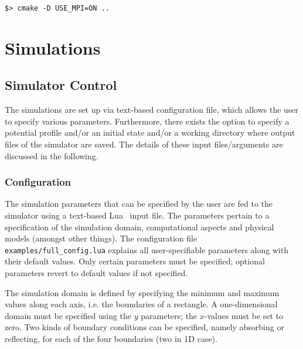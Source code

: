 \begin{lstlisting}
$> cmake -D USE_MPI=ON ..
\end{lstlisting}




\section{Simulations} \label{ch:simulations} %

\subsection{Simulator Control}

The simulations are set up via text-based configuration file, which allows the user to specify various parameters. Furthermore, there exists the option to specify a potential profile and/or an initial state and/or a working directory where output files of the simulator are saved. The details of these input files/arguments are discussed in the following.

\subsubsection{Configuration}

The simulation parameters that can be specified by the user are fed to the simulator using a text-based Lua~\cite{lua} input file. The parameters pertain to a specification of the simulation domain, computational aspects and physical models (amongst other things). The configuration file \texttt{examples/full\_config.lua} explains all user-specifiable parameters along with their default values. Only certain parameters must be specified; optional parameters revert to default values if not specified. %

The simulation domain is defined by specifying the minimum and maximum values along each axis, i.e. the boundaries of a rectangle. A one-dimensional domain must be specified using the $y$ parameters;  the $x$-values must be set to zero. Two kinds of boundary conditions can be specified, namely absorbing or reflecting, for each of the four boundaries (two in 1D case).

